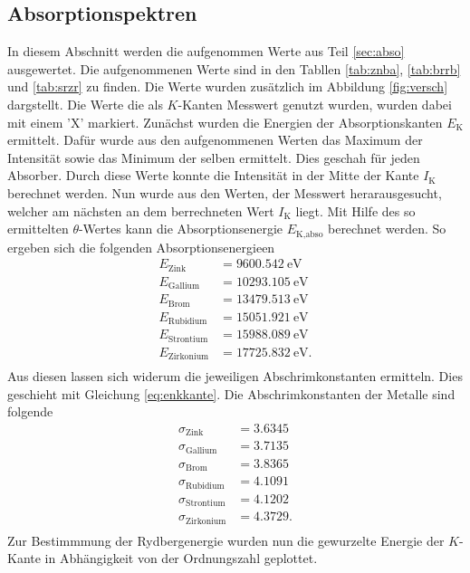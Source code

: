\subsection{Absorptionspektren}
In diesem Abschnitt werden die aufgenommen Werte aus Teil \ref{sec:abso} ausgewertet.
Die aufgenommenen Werte sind in den Tabllen \ref{tab:znba}, \ref{tab:brrb} und \ref{tab:srzr} zu finden.
Die Werte wurden zusätzlich im Abbildung \ref{fig:versch} dargstellt.
Die Werte die als $K$-Kanten Messwert genutzt wurden, wurden dabei mit einem 'X' markiert.
Zunächst wurden die Energien der Absorptionskanten $E_\text{K}$ ermittelt.
Dafür wurde aus den aufgenommenen Werten das Maximum der Intensität sowie das Minimum der selben ermittelt.
Dies geschah für jeden Absorber.
Durch diese Werte konnte die Intensität in der Mitte der Kante $I_\text{K}$ berechnet werden.
Nun wurde aus den Werten, der Messwert herarausgesucht, welcher am nächsten an dem berrechneten Wert $I_\text{K}$ liegt.
Mit Hilfe des so ermittelten $\theta$-Wertes kann die Absorptionsenergie $E_\text{K,abso}$ berechnet werden.
So ergeben sich die folgenden Absorptionsenergieen
\begin{align*}
E_\text{Zink} & = \SI{9600.542}{\eV} \\
E_\text{Gallium} & = \SI{10293.105}{\eV}\\
E_\text{Brom} & = \SI{13479.513}{\eV} \\
E_\text{Rubidium} & = \SI{15051.921}{\eV} \\
E_\text{Strontium} & = \SI{15988.089}{\eV}  \\
E_\text{Zirkonium} & = \SI{17725.832}{\eV}.  \\
\end{align*}
Aus diesen lassen sich widerum die jeweiligen Abschrimkonstanten ermitteln.
Dies geschieht mit Gleichung \eqref{eq:enkkante}.
Die Abschrimkonstanten der Metalle sind folgende
\begin{align*}
  \sigma_\text{Zink} & = 3.6345   \\
  \sigma_\text{Gallium} & = 3.7135 \\
  \sigma_\text{Brom} & = 3.8365 \\
  \sigma_\text{Rubidium} & = 4.1091 \\
  \sigma_\text{Strontium} & = 4.1202\\ 
  \sigma_\text{Zirkonium} & = 4.3729.\\
\end{align*}
Zur Bestimmmung der Rydbergenergie wurden nun die gewurzelte Energie der $K$-Kante in Abhängigkeit von der Ordnungszahl geplottet.
